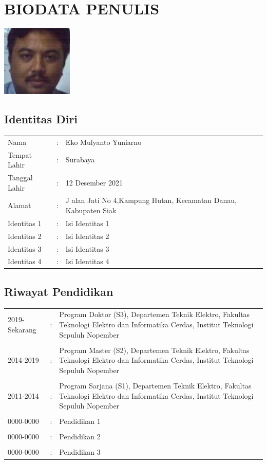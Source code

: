 \chapter*{BIODATA PENULIS}
	\begin{center}
		\includegraphics[height=0.2\textheight]{./ubah/Foto}
	\end{center}
\section*{Identitas Diri}
\begin{tabular}{p{3cm}cp{9cm}}
	Nama  		  & :&
		Eko Mulyanto Yuniarno \\
	Tempat Lahir  & :&
		Surabaya\\
	Tanggal Lahir &:& 
		12 Desember 2021\\
	Alamat        &:& J
		alan Jati No 4,Kampung Hutan, Kecamatan Danau, Kabupaten Siak\\
	Identitas 1   &:&
		 Isi Identitas 1\\
	Identitas 2   &:& 
		Isi Identitas 2\\
	Identitas 3   &:&
		 Isi Identitas 3\\
	Identitas 4   &:&
		 Isi Identitas 4\\
\end{tabular}

\section*{Riwayat Pendidikan}
\begin{tabular}{p{3cm}cp{9cm}}
	2019-Sekarang  	& :&
		Program Doktor (S3), Departemen Teknik  Elektro, Fakultas Teknologi Elektro dan Informatika Cerdas, Institut Teknologi  Sepuluh Nopember\\
	&&\\
	2014-2019  & :&
		Program Master (S2), Departemen Teknik  Elektro, Fakultas Teknologi Elektro dan Informatika Cerdas, Institut Teknologi  Sepuluh Nopember\\
	&&\\
	2011-2014  & :&
		Program Sarjana (S1), Departemen Teknik  Elektro, Fakultas Teknologi Elektro dan Informatika Cerdas, Institut Teknologi  Sepuluh Nopember\\
	&&\\
	0000-0000  & :&
		Pendidikan 1\\
	&&\\
	0000-0000  & :&
		Pendidikan 2\\
	&&\\
	0000-0000  & :&
		Pendidikan 3\\
\end{tabular}


